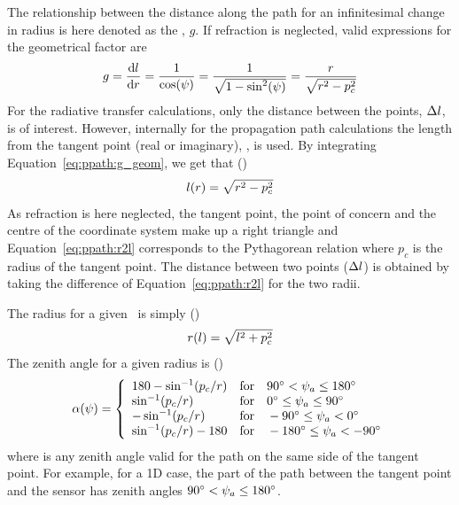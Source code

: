 The relationship between the distance along the path for an
infinitesimal change in radius is here denoted as the
, $g$. If refraction is neglected, valid
expressions for the geometrical factor are
\begin{equation}
  g = \frac{\mathrm{d} l}{\mathrm{d} r} 
           = \frac{1}{\cos(\psi)} = \frac{1}{\sqrt{1-\sin^2(\psi)}}
                                            = \frac{r}{\sqrt{r^2-p_c^2}}
  \label{eq:ppath:g_geom}
\end{equation}
For the radiative transfer calculations, only the distance between the
points, $\Delta l$, is of interest. However, internally for
the propagation path calculations the length from the tangent
point (real or imaginary), \PpathLng, is used. By integrating
Equation~\ref{eq:ppath:g_geom}, we get that ()
\begin{equation}
  l(r) = \sqrt{r^2-p_c^2} 
  \label{eq:ppath:r2l}
\end{equation}
As refraction is here neglected, the tangent point, the point of
concern and the centre of the coordinate system make up a right
triangle and Equation~\ref{eq:ppath:r2l} corresponds to the
Pythagorean relation where $p_c$ is the radius of the tangent point.
The distance between two points ($\Delta l$) is obtained by
taking the difference of Equation~\ref{eq:ppath:r2l} for the two
radii.

The radius for a given \PpathLng\ is simply ()
\begin{equation}
  r(l) = \sqrt{l^2+p_c^2} 
  \label{eq:ppath:l2r}
\end{equation}
The zenith angle for a given radius is ()
\begin{equation}
  \alpha(\psi) = \left\{
   \begin{array}{ll}
    180 - \sin^{-1}(p_c/r) & 
                   \textrm{for}\quad 90^\circ < \psi_{a} \leq 180^\circ\\
    \sin^{-1}(p_c/r) & 
                   \textrm{for}\quad 0^\circ \leq \psi_{a} \leq 90^\circ\\
    -\sin^{-1}(p_c/r) & 
                   \textrm{for}\quad -90^\circ \leq \psi_{a} < 0^\circ\\
    \sin^{-1}(p_c/r) - 180 & 
                  \textrm{for}\quad -180^\circ \leq \psi_{a} < -90^\circ\\
   \end{array}   \right.
  \label{eq:ppath:r2psi}
\end{equation}
where  is any zenith angle valid for the path on the same
side of the tangent point. For example, for a 1D case, the part of the
path between the tangent point and the sensor has zenith angles
$90^\circ < \psi_{a} \leq 180^\circ$.

